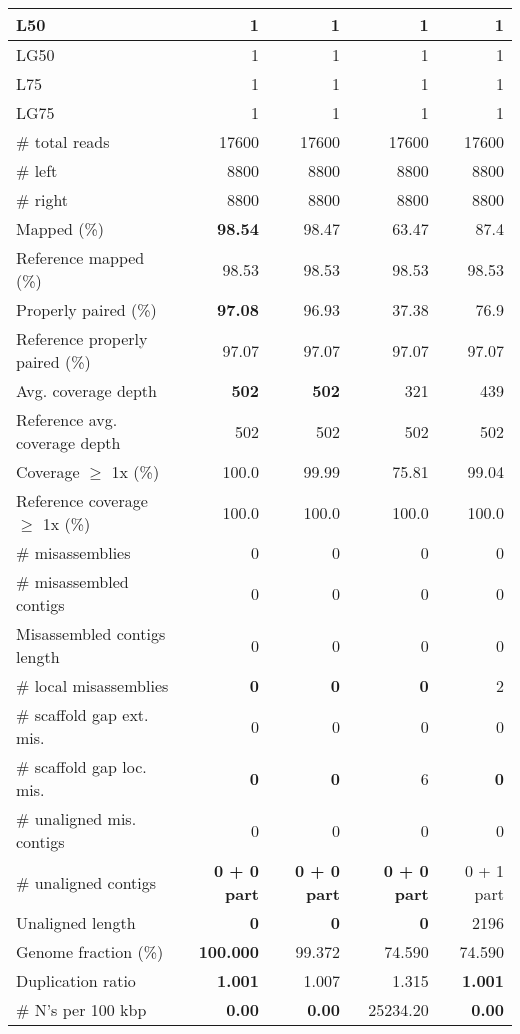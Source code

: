 \documentclass[12pt,a4paper]{article}
\begin{document}
\begin{table}[ht]
\begin{center}
\begin{tabular}{|l*{4}{|r}|}
L50 & 1 & 1 & 1 & 1 \\ \hline
LG50 & 1 & 1 & 1 & 1 \\ \hline
L75 & 1 & 1 & 1 & 1 \\ \hline
LG75 & 1 & 1 & 1 & 1 \\ \hline
\# total reads & 17600 & 17600 & 17600 & 17600 \\ \hline
\# left & 8800 & 8800 & 8800 & 8800 \\ \hline
\# right & 8800 & 8800 & 8800 & 8800 \\ \hline
Mapped (\%) & {\bf 98.54} & 98.47 & 63.47 & 87.4 \\ \hline
Reference mapped (\%) & 98.53 & 98.53 & 98.53 & 98.53 \\ \hline
Properly paired (\%) & {\bf 97.08} & 96.93 & 37.38 & 76.9 \\ \hline
Reference properly paired (\%) & 97.07 & 97.07 & 97.07 & 97.07 \\ \hline
Avg. coverage depth & {\bf 502} & {\bf 502} & 321 & 439 \\ \hline
Reference avg. coverage depth & 502 & 502 & 502 & 502 \\ \hline
Coverage $\geq$ 1x (\%) & 100.0 & 99.99 & 75.81 & 99.04 \\ \hline
Reference coverage $\geq$ 1x (\%) & 100.0 & 100.0 & 100.0 & 100.0 \\ \hline
\# misassemblies & 0 & 0 & 0 & 0 \\ \hline
\# misassembled contigs & 0 & 0 & 0 & 0 \\ \hline
Misassembled contigs length & 0 & 0 & 0 & 0 \\ \hline
\# local misassemblies & {\bf 0} & {\bf 0} & {\bf 0} & 2 \\ \hline
\# scaffold gap ext. mis. & 0 & 0 & 0 & 0 \\ \hline
\# scaffold gap loc. mis. & {\bf 0} & {\bf 0} & 6 & {\bf 0} \\ \hline
\# unaligned mis. contigs & 0 & 0 & 0 & 0 \\ \hline
\# unaligned contigs & {\bf 0 + 0 part} & {\bf 0 + 0 part} & {\bf 0 + 0 part} & 0 + 1 part \\ \hline
Unaligned length & {\bf 0} & {\bf 0} & {\bf 0} & 2196 \\ \hline
Genome fraction (\%) & {\bf 100.000} & 99.372 & 74.590 & 74.590 \\ \hline
Duplication ratio & {\bf 1.001} & 1.007 & 1.315 & {\bf 1.001} \\ \hline
\# N's per 100 kbp & {\bf 0.00} & {\bf 0.00} & 25234.20 & {\bf 0.00} \\ \hline

\end{tabular}
\end{center}
\end{table}
\end{document}
